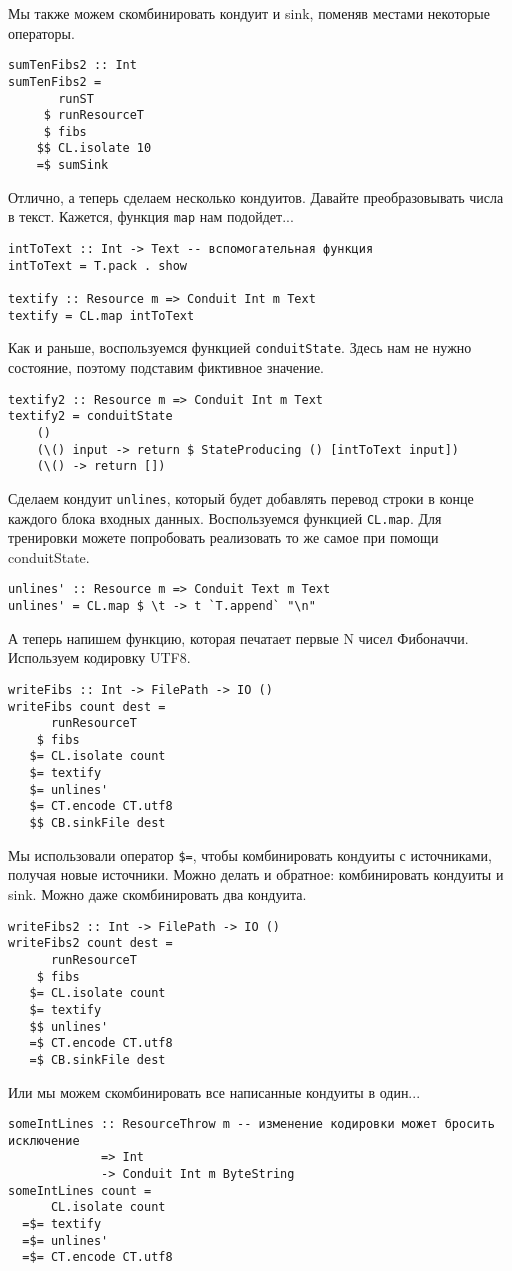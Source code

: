 Мы также можем скомбинировать кондуит и sink, поменяв местами некоторые операторы.
\begin{lstlisting}
sumTenFibs2 :: Int
sumTenFibs2 =
       runST
     $ runResourceT
     $ fibs
    $$ CL.isolate 10
    =$ sumSink
\end{lstlisting}
Отлично, а теперь сделаем несколько кондуитов. Давайте преобразовывать числа в текст.
Кажется, функция \lstinline=map= нам подойдет...
\begin{lstlisting}
intToText :: Int -> Text -- вспомогательная функция 
intToText = T.pack . show

textify :: Resource m => Conduit Int m Text
textify = CL.map intToText
\end{lstlisting}
Как и раньше, воспользуемся функцией \lstinline=conduitState=. Здесь
нам не нужно состояние, поэтому подставим фиктивное значение.
\begin{lstlisting}
textify2 :: Resource m => Conduit Int m Text
textify2 = conduitState
    ()
    (\() input -> return $ StateProducing () [intToText input])
    (\() -> return [])
\end{lstlisting}
Сделаем кондуит \lstinline=unlines=, который будет добавлять перевод строки в конце каждого блока
входных данных. Воспользуемся функцией \lstinline=CL.map=. Для тренировки можете попробовать реализовать то же самое при помощи conduitState.
\begin{lstlisting}
unlines' :: Resource m => Conduit Text m Text
unlines' = CL.map $ \t -> t `T.append` "\n"
\end{lstlisting}
А теперь напишем функцию, которая печатает первые N чисел Фибоначчи. Используем
кодировку UTF8.
\begin{lstlisting}
writeFibs :: Int -> FilePath -> IO ()
writeFibs count dest =
      runResourceT
    $ fibs
   $= CL.isolate count
   $= textify
   $= unlines'
   $= CT.encode CT.utf8
   $$ CB.sinkFile dest
\end{lstlisting}
Мы использовали оператор \lstinline'$=', чтобы комбинировать кондуиты с источниками,
получая
новые источники. Можно делать и обратное: комбинировать кондуиты и sink. Можно даже
скомбинировать два кондуита.
\begin{lstlisting}
writeFibs2 :: Int -> FilePath -> IO ()
writeFibs2 count dest =
      runResourceT
    $ fibs
   $= CL.isolate count
   $= textify
   $$ unlines'
   =$ CT.encode CT.utf8
   =$ CB.sinkFile dest
\end{lstlisting}
Или мы можем скомбинировать все написанные кондуиты в один...
\begin{lstlisting}
someIntLines :: ResourceThrow m -- изменение кодировки может бросить исключение
             => Int
             -> Conduit Int m ByteString
someIntLines count =
      CL.isolate count
  =$= textify
  =$= unlines'
  =$= CT.encode CT.utf8
\end{lstlisting}
